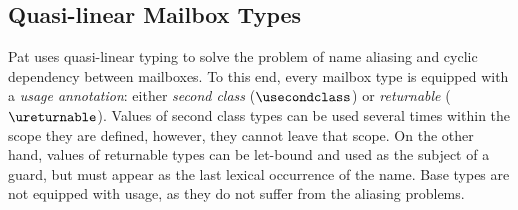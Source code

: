 \subsection{Quasi-linear Mailbox Types}

Pat uses quasi-linear typing \cite{kobayashiQuasilinearTypes1999,ennalsLinearTypesPacket2004a} to solve the problem of name aliasing and cyclic dependency between mailboxes.
To this end, every mailbox type is equip\-ped with a \emph{usage annotation}: either \emph{second class} ($\usecondclass$) or \emph{returnable} ($\ureturnable$).
Values of second class types can be used several times within the scope they are
defined, however, they cannot leave that scope.  On the other hand, values of
returnable types can be let-bound and used as the subject of a guard, but must
appear as the last lexical occurrence of the name.
Base types are not equipped with usage, as they do not suffer from the aliasing problems.

